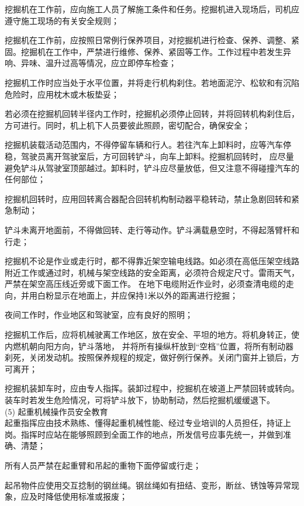  挖掘机在工作前，应向施工人员了解施工条件和任务。挖掘机进入现场后，司机应遵守施工现场的有关安全规则；

 挖掘机在工作前，应按照日常例行保养项目，对挖掘机进行检查、保养、调整、紧固。挖掘机在工作中，严禁进行维修、保养、紧固等工作。工作过程中若发生异响、异味、温升过高等情况，应立即停车检查；

 挖掘机工作时应当处于水平位置，并将走行机构刹住。若地面泥泞、松软和有沉陷危险时，应用枕木或木板垫妥；

 若必须在挖掘机回转半径内工作时，挖掘机必须停止回转，并将回转机构刹住后，方可进行。同时，机上机下人员要彼此照顾，密切配合，确保安全；

 挖掘机装载活动范围内，不得停留车辆和行人。若往汽车上卸料时，应等汽车停稳，驾驶员离开驾驶室后，方可回转铲斗，向车上卸料。挖掘机回转时，
应尽量避免铲斗从驾驶室顶部越过。卸料时，铲斗应尽量放低，但又注意不得碰撞汽车的任何部位；

 挖掘机回转时，应用回转离合器配合回转机构制动器平稳转动，禁止急剧回转和紧急制动；

 铲斗未离开地面前，不得做回转、走行等动作。铲斗满载悬空时，不得起落臂杆和行走；

 挖掘机不论是作业或走行时，都不得靠近架空输电线路。如必须在高低压架空线路附近工作或通过时，机械与架空线路的安全距离，必须符合规定尺寸。雷雨天气，严禁在架空高压线近旁或下面工作。
在地下电缆附近作业时，必须查清电缆的走向，并用白粉显示在地面上，并应保持1米以外的距离进行挖掘；

 夜间工作时，作业地区和驾驶室，应有良好的照明；

 挖掘机工作后，应将机械驶离工作地区，放在安全、平坦的地方。将机身转正，使内燃机朝向阳方向，铲斗落地，
并将所有操纵杆放到“空档”位置，将所有制动器刹死，关闭发动机。按照保养规程的规定，做好例行保养。关闭门窗并上锁后，方可离开；

 挖掘机装卸车时，应由专人指挥。装卸过程中，挖掘机在坡道上严禁回转或转向。装车时若发生危险情况，可将铲斗放下，协助制动，然后挖掘机缓缓退下。\\


(5) 起重机械操作员安全教育\\

 起重指挥应由技术熟练、懂得起重机械性能、经过专业培训的人员担任，持证上岗。指挥时应站在能够照顾到全面工作的地点，所发信号应事先统一，并做到准确、清楚；

 所有人员严禁在起重臂和吊起的重物下面停留或行走；

 起吊物件应使用交互捻制的钢丝绳。钢丝绳如有扭结、变形，断丝、锈蚀等异常现象，应及时降低使用标准或报废；

